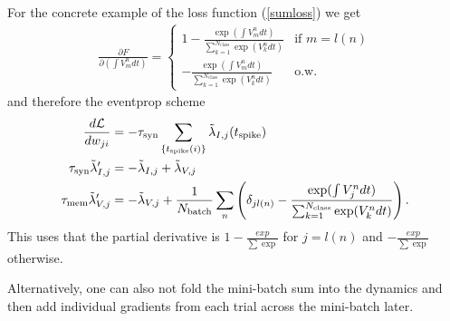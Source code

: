 \documentclass[a4paper]{article}
\begin{document}
  For the concrete example of the loss function (\ref{sumloss}) we get
  \begin{align}
    \frac{\partial F}{\partial (\int V_m^n dt)} = \left\{ \begin{array}{ll}
      1 -\frac{\exp(\int V_m^n dt)}{\sum_{k=1}^{N_{\text{class}}} \exp(V_k^n dt)} & \text{if } m=l(n) \\[0.1cm]
      -\frac{\exp(\int V_m^n dt)}{\sum_{k=1}^{N_{\text{class}}} \exp(V_k^n dt)} & \text{o.w.}
      \end{array}\right.
  \end{align}
  and therefore the eventprop scheme
  \begin{align}
    \frac{d{\cal L}}{d w_{ji}} &= -\tau_{\text{syn}} \sum_{\{t_{\text{spike}}(i)\}} \tilde{\lambda}_{I,j}(t_{\text{spike}}) \\
    \tau_{\text{syn}} \tilde{\lambda}_{I,j}' &= -\tilde{\lambda}_{I,j} + \tilde{\lambda}_{V,j} \\
    \tau_{\text{mem}} \tilde{\lambda}_{V,j}' &= - \tilde{\lambda}_{V,j} + \frac{1}{N_{\text{batch}}} \sum_n \left(\delta_{jl(n)} -\frac{\exp(\int V_j^n dt)}{\sum_{k=1}^{N_{\text{class}}} \exp(V_k^n dt)} \right) . \\
  \end{align}
  This uses that the partial derivative is $1-\frac{exp}{\sum \exp}$ for $j=l(n)$ and $-\frac{exp}{\sum \exp}$ otherwise.
  
  Alternatively, one can also not fold the mini-batch sum into the dynamics and then add individual gradients from each trial across the mini-batch later.
\end{document}
